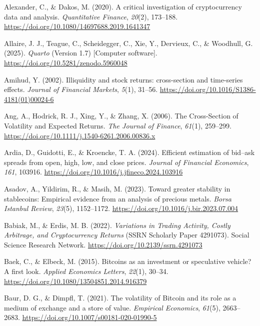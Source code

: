 \documentclass[
  12pt,
  a4paper,
  openany]{scrbook}
\newlength{\cslhangindent}
\newenvironment{CSLReferences}[2] %
 {\begin{list}{}{%
  \setlength{\itemindent}{0pt}
  \setlength{\leftmargin}{0pt}
  \setlength{\parsep}{0pt}
  \ifodd #1
   \setlength{\leftmargin}{\cslhangindent}
   \setlength{\itemindent}{-1\cslhangindent}
  \fi
  \setlength{\itemsep}{#2\baselineskip}}}
 {\end{list}}
\begin{document}
\label{refs}
\begin{CSLReferences}{1}{0}
Alexander, C., \& Dakos, M. (2020). A critical investigation of
cryptocurrency data and analysis. \emph{Quantitative Finance},
\emph{20}(2), 173--188.
\url{https://doi.org/10.1080/14697688.2019.1641347}

Allaire, J. J., Teague, C., Scheidegger, C., Xie, Y., Dervieux, C., \&
Woodhull, G. (2025). \emph{{Quarto}} (Version 1.7) {[}Computer
software{]}. \url{https://doi.org/10.5281/zenodo.5960048}

Amihud, Y. (2002). Illiquidity and stock returns: cross-section and
time-series effects. \emph{Journal of Financial Markets}, \emph{5}(1),
31--56. \url{https://doi.org/10.1016/S1386-4181(01)00024-6}

Ang, A., Hodrick, R. J., Xing, Y., \& Zhang, X. (2006). The
Cross-Section of Volatility and Expected Returns. \emph{The Journal of
Finance}, \emph{61}(1), 259--299.
\url{https://doi.org/10.1111/j.1540-6261.2006.00836.x}

Ardia, D., Guidotti, E., \& Kroencke, T. A. (2024). Efficient estimation
of bid--ask spreads from open, high, low, and close prices.
\emph{Journal of Financial Economics}, \emph{161}, 103916.
\url{https://doi.org/10.1016/j.jfineco.2024.103916}

Asadov, A., Yildirim, R., \& Masih, M. (2023). Toward greater stability
in stablecoins: Empirical evidence from an analysis of precious metals.
\emph{Borsa Istanbul Review}, \emph{23}(5), 1152--1172.
\url{https://doi.org/10.1016/j.bir.2023.07.004}

Babiak, M., \& Erdis, M. B. (2022). \emph{Variations in Trading
Activity, Costly Arbitrage, and Cryptocurrency Returns} (SSRN Scholarly
Paper 4291073). Social Science Research Network.
\url{https://doi.org/10.2139/ssrn.4291073}

Baek, C., \& Elbeck, M. (2015). Bitcoins as an investment or speculative
vehicle? A first look. \emph{Applied Economics Letters}, \emph{22}(1),
30--34. \url{https://doi.org/10.1080/13504851.2014.916379}

Baur, D. G., \& Dimpfl, T. (2021). The volatility of Bitcoin and its
role as a medium of exchange and a store of value. \emph{Empirical
Economics}, \emph{61}(5), 2663--2683.
\url{https://doi.org/10.1007/s00181-020-01990-5}


\end{CSLReferences}
\end{document}
